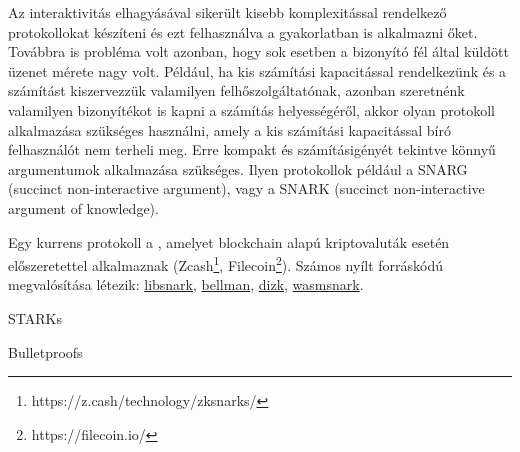 Az interaktivitás elhagyásával sikerült kisebb komplexitással rendelkező protokollokat készíteni és ezt felhasználva a gyakorlatban is alkalmazni őket. Továbbra is probléma volt azonban, hogy sok esetben a bizonyító fél által küldött üzenet mérete nagy volt. Például, ha kis számítási kapacitással rendelkezünk és a számítást kiszervezzük valamilyen felhőszolgáltatónak, azonban szeretnénk valamilyen bizonyítékot is kapni a számítás helyességéről, akkor olyan protokoll alkalmazása szükséges használni, amely a kis számítási kapacitással bíró felhasználót nem terheli meg. Erre kompakt és számításigényét tekintve könnyű argumentumok alkalmazása szükséges. Ilyen protokollok például a SNARG (succinct non-interactive argument), vagy a SNARK (succinct non-interactive argument
of knowledge).

Egy kurrens protokoll a \cite{SNARK}, amelyet blockchain alapú kriptovaluták esetén előszeretettel alkalmaznak (Zcash\footnote{https://z.cash/technology/zksnarks/}, Filecoin\footnote{https://filecoin.io/}). Számos nyílt forráskódú megvalósítása létezik: \href{https://github.com/scipr-lab/libsnark}{libsnark}, \href{https://github.com/zkcrypto/bellman}{bellman}, \href{https://github.com/scipr-lab/dizk}{dizk}, \href{https://github.com/iden3/wasmsnark}{wasmsnark}.

STARKs \cite{STARK}

Bulletproofs \cite{BULLETPROOF}